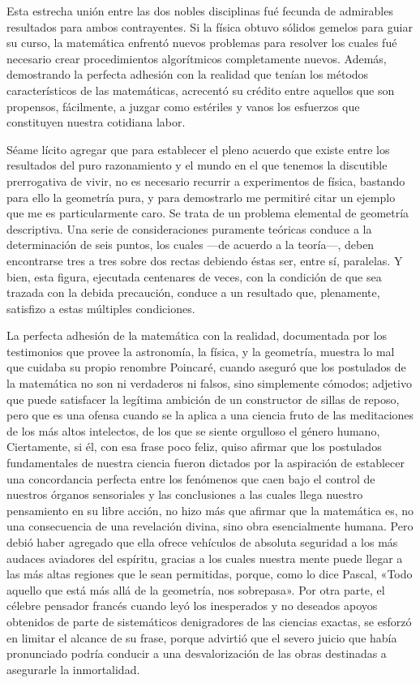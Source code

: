 \documentclass[a4paper, 12pt, draft]{article}
\begin{document}
{{Esta estrecha unión entre las dos nobles disciplinas fué fecunda de admirables resultados para ambos contrayentes. Si la física obtuvo sólidos gemelos para guiar su curso, la matemática enfrentó nuevos problemas para resolver los cuales fué necesario crear procedimientos algorítmicos completamente nuevos. Además, demostrando la perfecta adhesión con la realidad que tenían los métodos característicos de las matemáticas, acrecentó su crédito entre aquellos que son propensos, fácilmente, a juzgar como estériles y vanos los esfuerzos que constituyen nuestra cotidiana labor.


Séame lícito agregar que para establecer el pleno acuerdo que existe entre los resultados del puro razonamiento y el mundo en el que tenemos la discutible prerrogativa de vivir, no es necesario recurrir a experimentos de física, bastando para ello la geometría pura, y para demostrarlo me permitiré citar un ejemplo que me es particularmente caro. Se trata de un problema elemental de geometría descriptiva. Una serie de consideraciones puramente teóricas conduce a la determinación de seis puntos, los cuales ---de acuerdo a la teoría---, deben encontrarse tres a tres sobre dos rectas debiendo éstas ser, entre sí, paralelas. Y bien, esta figura, ejecutada centenares de veces, con la condición de que sea trazada con la debida precaución, conduce a un resultado que, plenamente, satisfizo a estas múltiples condiciones.

La perfecta adhesión de la matemática con la realidad, documentada por los testimonios que provee la astronomía, la física, y la geometría, muestra lo mal que cuidaba su propio renombre Poincaré, cuando aseguró que los postulados de la matemática no son ni verdaderos ni falsos, sino simplemente cómodos; adjetivo que puede satisfacer la legítima ambición de un constructor de sillas de reposo, pero que es una ofensa cuando se la aplica a una ciencia fruto de las meditaciones de los más altos intelectos, de los que se siente orgulloso el género humano, Ciertamente, si él, con esa frase poco feliz, quiso
afirmar que los postulados fundamentales de nuestra ciencia fueron dictados por la aspiración de establecer una concordancia perfecta entre los fenómenos que caen bajo el control de nuestros órganos sensoriales y las conclusiones a las cuales llega nuestro pensamiento en su libre acción, no hizo más que afirmar que la matemática es, no una consecuencia de una revelación divina, sino obra esencialmente humana. Pero debió haber agregado que ella ofrece vehículos de absoluta seguridad a los más audaces aviadores del espíritu, gracias a los cuales nuestra mente puede llegar a las más altas regiones que le sean permitidas, porque, como lo dice Pascal, «Todo aquello que está más allá de la geometría, nos sobrepasa». Por otra parte, el célebre pensador francés cuando leyó los inesperados y no deseados apoyos obtenidos de parte de sistemáticos denigradores de las ciencias exactas, se esforzó en limitar el alcance de su frase, porque advirtió que el severo juicio que había pronunciado podría conducir a una desvalorización de las obras destinadas a asegurarle la inmortalidad.

}}
\end{document}
